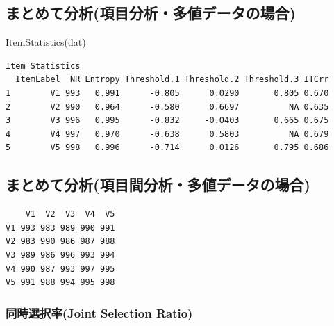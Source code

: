 \documentclass[
  a4paper,
]{ltjsbook}
\newenvironment{Shaded}{\begin{snugshade}}{\end{snugshade}}
\newcommand{\FunctionTok}[1]{\textcolor[rgb]{0.28,0.35,0.67}{#1}}
\newcommand{\NormalTok}[1]{\textcolor[rgb]{0.00,0.23,0.31}{#1}}
\newcommand{\OtherTok}[1]{\textcolor[rgb]{0.00,0.23,0.31}{#1}}
\newcommand{\SpecialCharTok}[1]{\textcolor[rgb]{0.37,0.37,0.37}{#1}}
\begin{document}
\subsection{まとめて分析(項目分析・多値データの場合)}\label{ux307eux3068ux3081ux3066ux5206ux6790ux9805ux76eeux5206ux6790ux591aux5024ux30c7ux30fcux30bfux306eux5834ux5408}

\begin{Shaded}
\begin{Highlighting}[]
\FunctionTok{ItemStatistics}\NormalTok{(dat)}
\end{Highlighting}
\end{Shaded}

\begin{verbatim}
Item Statistics
  ItemLabel  NR Entropy Threshold.1 Threshold.2 Threshold.3 ITCrr
1        V1 993   0.991      -0.805      0.0290       0.805 0.670
2        V2 990   0.964      -0.580      0.6697          NA 0.635
3        V3 996   0.995      -0.832     -0.0403       0.665 0.675
4        V4 997   0.970      -0.638      0.5803          NA 0.679
5        V5 998   0.996      -0.714      0.0126       0.795 0.686
\end{verbatim}

\subsection{まとめて分析(項目間分析・多値データの場合)}\label{ux307eux3068ux3081ux3066ux5206ux6790ux9805ux76eeux9593ux5206ux6790ux591aux5024ux30c7ux30fcux30bfux306eux5834ux5408}

\begin{Shaded}
\end{Shaded}

\begin{verbatim}
    V1  V2  V3  V4  V5
V1 993 983 989 990 991
V2 983 990 986 987 988
V3 989 986 996 993 994
V4 990 987 993 997 995
V5 991 988 994 995 998
\end{verbatim}

\subsubsection{同時選択率(Joint Selection
Ratio)}\label{ux540cux6642ux9078ux629eux7387joint-selection-ratio}
\end{document}

